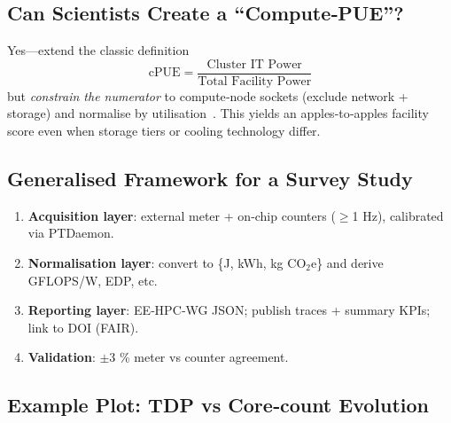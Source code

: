 \subsection{Can Scientists Create a “Compute‑PUE”?}

Yes—extend the classic definition
\[
\text{cPUE}=\frac{\text{Cluster IT Power}}
                  {\text{Total Facility Power}}
\]
but \emph{constrain the numerator} to compute‑node sockets (exclude
network + storage) and normalise by utilisation~\cite{laszewski2010}.
This yields an apples‑to‑apples facility score even when storage tiers
or cooling technology differ.

\subsection{Generalised Framework for a Survey Study}

\begin{enumerate}
  \item \textbf{Acquisition layer}: external meter + on‑chip counters
        ($\ge$1 Hz), calibrated via PTDaemon.
  \item \textbf{Normalisation layer}: convert to \{J, kWh, kg CO$_2$e\}
        and derive GFLOPS/W, EDP, etc.
  \item \textbf{Reporting layer}: EE‑HPC‑WG JSON; publish traces +
        summary KPIs; link to DOI (FAIR).
  \item \textbf{Validation}: $\pm$3 \% meter vs counter agreement.
\end{enumerate}

\subsection{Example Plot: TDP vs Core‑count Evolution}




